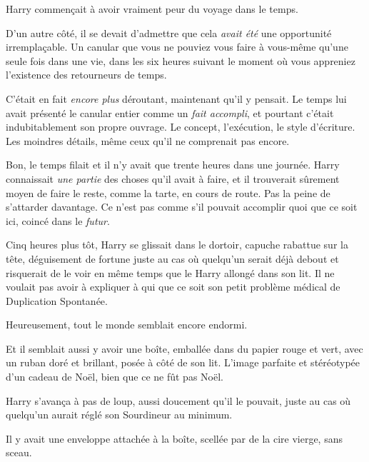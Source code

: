 Harry commençait à avoir vraiment peur du voyage dans le temps.

D'un autre côté, il se devait d'admettre que cela \emph{avait été} une opportunité irremplaçable.
Un canular que vous ne pouviez vous faire à vous-même qu'une seule fois dans une vie, dans les six heures suivant le moment où vous appreniez l'existence des retourneurs de temps.

C'était en fait \emph{encore plus} déroutant, maintenant qu'il y pensait.
Le temps lui avait présenté le canular entier comme un \emph{fait accompli}, et pourtant c'était indubitablement son propre ouvrage.
Le concept, l'exécution, le style d'écriture.
Les moindres détails, même ceux qu'il ne comprenait pas encore.

Bon, le temps filait et il n'y avait que trente heures dans une journée.
Harry connaissait \emph{une partie} des choses qu'il avait à faire, et il trouverait sûrement moyen de faire le reste, comme la tarte, en cours de route.
Pas la peine de s'attarder davantage.
Ce n'est pas comme s'il pouvait accomplir quoi que ce soit ici, coincé dans le \emph{futur}.

\later

Cinq heures plus tôt, Harry se glissait dans le dortoir, capuche rabattue sur la tête, déguisement de fortune juste au cas où quelqu'un serait déjà debout et risquerait de le voir en même temps que le Harry allongé dans son lit.
Il ne voulait pas avoir à expliquer à qui que ce soit son petit problème médical de Duplication Spontanée.

Heureusement, tout le monde semblait encore endormi.

Et il semblait aussi y avoir une boîte, emballée dans du papier rouge et vert, avec un ruban doré et brillant, posée à côté de son lit.
L'image parfaite et stéréotypée d'un cadeau de Noël, bien que ce ne fût pas Noël.

Harry s'avança à pas de loup, aussi doucement qu'il le pouvait, juste au cas où quelqu'un aurait réglé son Sourdineur au minimum.

Il y avait une enveloppe attachée à la boîte, scellée par de la cire vierge, sans sceau.\strut

